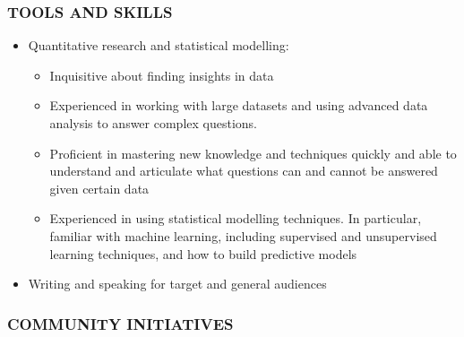 \documentclass[
]{article}
\providecommand{\tightlist}{%
  \setlength{\itemsep}{0pt}\setlength{\parskip}{0pt}}
\begin{document}
\hypertarget{tools-and-skills}{%
\subsubsection{TOOLS AND SKILLS}\label{tools-and-skills}}

\begin{itemize}
\tightlist
\item
  Quantitative research and statistical modelling:

  \begin{itemize}
  \tightlist
  \item
    Inquisitive about finding insights in data
  \item
    Experienced in working with large datasets and using advanced data
    analysis to answer complex questions.
  \item
    Proficient in mastering new knowledge and techniques quickly and
    able to understand and articulate what questions can and cannot be
    answered given certain data
  \item
    Experienced in using statistical modelling techniques. In
    particular, familiar with machine learning, including supervised and
    unsupervised learning techniques, and how to build predictive models
  \end{itemize}
\item
  Writing and speaking for target and general audiences
\end{itemize}

\hypertarget{community-initiatives}{%
\subsubsection{COMMUNITY INITIATIVES}\label{community-initiatives}}
\end{document}
